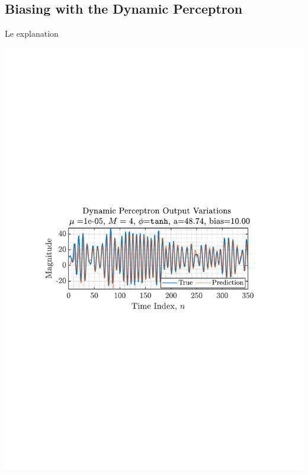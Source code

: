 \documentclass[12pt]{article}
\begin{document}
	\subsection{Biasing with the Dynamic Perceptron} \label{sec: 4-4-biasing-dynamic-perceptron}
		\begin{minipage}[b]{0.49\textwidth}
			Le explanation
		\end{minipage}%
		\begin{minipage}{0.04\textwidth}
			\hspace*{0.04\textwidth}
		\end{minipage}%
		\begin{minipage}{0.49\textwidth}
			\centering
			\includegraphics[trim={2.2cm 11.2cm 3.15cm  11.2cm}, clip, width=\textwidth]{../MATLAB/figures/q4_4_fig01.pdf} 
			
			\captionsetup{justification=centering}
			\label{fig: 4-4}
		\end{minipage}%
\end{document}
